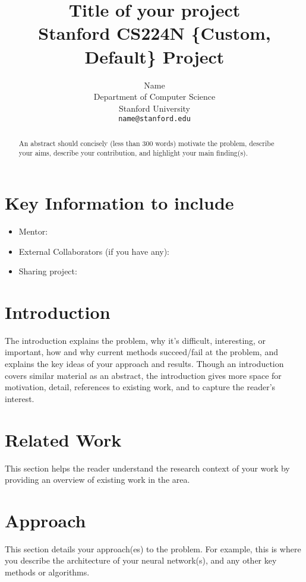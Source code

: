 \documentclass{article}
\title{
  Title of your project \\
  \vspace{1em}
  \small{\normalfont Stanford CS224N \{Custom, Default\} Project}  %
}
\author{
  Name \\
  Department of Computer Science \\
  Stanford University \\
  \texttt{name@stanford.edu} \\
}
\begin{document}
\maketitle

\begin{abstract}
An abstract should concisely (less than 300 words) motivate the problem, describe your aims, describe your contribution, and highlight your main finding(s). 
\end{abstract}


\section{Key Information to include}
\begin{itemize}
    \item Mentor:
    \item External Collaborators (if you have any):
    \item Sharing project:
\end{itemize}


\section{Introduction}
The introduction explains the problem, why it's difficult, interesting, or important, how and why current methods succeed/fail at the problem, and explains the key ideas of your approach and results. Though an introduction covers similar material as an abstract, the introduction gives more space for motivation, detail, references to existing work, and to capture the reader's interest.

\section{Related Work}
This section helps the reader understand the research context of your work by providing an overview of existing work in the area.

\section{Approach}
This section details your approach(es) to the problem. 
For example, this is where you describe the architecture of your neural network(s), and any other key methods or algorithms.
\end{document}
